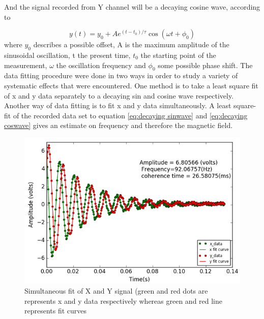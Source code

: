 And the signal recorded  from Y channel will be a decaying cosine wave, according to
                                       
  \begin{equation}
 y(t) = y_0 + A   e^{(t-t_0)/\tau}\cos(\omega t + \phi_0)\label{eq:decaying coswave}
\end{equation}
where $y_0$ describes a possible offset, A is the maximum amplitude of the sinusoidal oscillation,
t the present time, $t_0$ the starting point of the measurement, $\omega$ the oscillation frequency and $\phi_0$  some possible phase shift. The data fitting procedure were done in two ways in order to study a variety of systematic effects that were encountered. One method is to take a least square fit of x and y data separately to a decaying sin and cosine wave respectively. Another way of data fitting is to fit x and y data simultaneously. A least square-fit of the recorded data set to equation \ref{eq:decaying sinwave} and \ref{eq:decaying coswave} gives an estimate on frequency and  therefore the magnetic field.
\begin{figure}[h]
\centering\includegraphics[width=0.55\linewidth]{figures/fid_simultaneous}
\caption{ Simultaneous fit of X and Y signal (green and red dots are represents x and y data respectively whereas green and red line  represents fit curves\label{Fig:FID fit}}
\end{figure}
  

